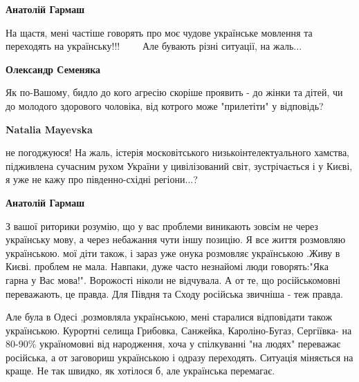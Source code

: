 \begin{itemize}
\begin{itemize}
\textbf{Анатолій Гармаш} 

На щастя, мені частіше говорять про моє чудове українське мовлення та
переходять на українську!!! 💙💛💙💛💙💛 Але бувають різні ситуації, на жаль...


 
\textbf{Олександр Семеняка} 

Як по-Вашому, бидло до кого агресію скоріше проявить - до жінки та дітей, чи до
молодого здорового чоловіка, від котрого може "прилетіти" у відповідь?

 
\textbf{Natalia Mayevska} 

не погоджуюся! На жаль, істерія московітського низькоінтелектуального хамства,
підживлена сучасним рухом України у цивілізований світ, зустрічається і у
Києві, я уже не кажу про південно-східні регіони...?


 
\textbf{Анатолій Гармаш} 

З вашої риторики розумію, що у вас проблеми виникають зовсім не через
українську мову, а через небажання чути іншу позицію. Я все життя розмовляю
українською. мої діти також, і зараз уже онука розмовляє українською .Живу в
Києві. проблем не мала. Навпаки, дуже часто незнайомі люди говорять:"Яка гарна
у Вас мова!". Ворожості ніколи не відчувала. А от те, що російськомовні
переважають, це правда. Для Півдня та Сходу російська звичніша - теж правда.

Але була в Одесі ,розмовляла українською, мені старалися відповідати також
українською. Курортні селища Грибовка, Санжейка, Кароліно-Бугаз, Сергіївка- на
80-90\% україномовні від народження, хоча у спілкуванні "на людях" переважає
російська, а от заговориш українською і одразу переходять. Ситуація міняється
на краще. Не так швидко, як хотілося б, але українська перемагає.


\end{itemize}
\end{itemize}
